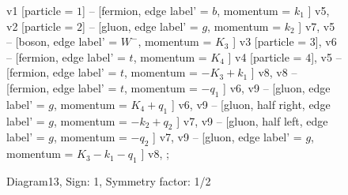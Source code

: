 \documentclass{revtex4}
\begin{document}
\begin{figure}[!htb]
\begin{center}
{    %
v1 [particle = \(1\)] -- [fermion, edge label' = \(b\), momentum = \(k_{1}\) ] v5, 
v2 [particle = \(2\)] -- [gluon, edge label' = \(g\), momentum = \(k_{2}\) ] v7, 
v5 -- [boson, edge label' = \(W^{-}\), momentum = \(K_{3}\) ] v3 [particle = \(3\)], 
v6 -- [fermion, edge label' = \(t\), momentum = \(K_{4}\) ] v4 [particle = \(4\)], 
v5 -- [fermion, edge label' = \(t\), momentum = \(-K_{3} + k_{1}\) ] v8, 
v8 -- [fermion, edge label' = \(t\), momentum = \(-q_{1}\) ] v6, 
v9 -- [gluon, edge label' = \(g\), momentum = \(K_{4} + q_{1}\) ] v6, 
v9 -- [gluon, half right, edge label' = \(g\), momentum = \(-k_{2} + q_{2}\) ] v7, 
v9 -- [gluon, half left, edge label' = \(g\), momentum = \(-q_{2}\) ] v7, 
v9 -- [gluon, edge label' = \(g\), momentum = \(K_{3} - k_{1} - q_{1}\) ] v8, 
};
\end{center}
\caption{Diagram13, Sign: 1, Symmetry factor: 1/2}
\end{figure}
\newpage
\end{document}
